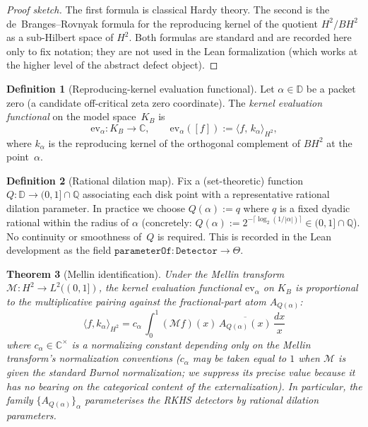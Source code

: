 \documentclass[12pt]{article}
\theoremstyle{plain}
\newtheorem{theorem}{Theorem}[section]
\theoremstyle{definition}
\newtheorem{definition}[theorem]{Definition}
\theoremstyle{remark}
\newcommand{\KB}{K_{B}}
\newcommand{\HardyTwo}{H^{2}}
\newcommand{\Disk}{\mathbb{D}}
\newcommand{\Complex}{\mathbb{C}}
\newcommand{\Rationals}{\mathbb{Q}}
\newcommand{\Mellin}{\mathcal{M}}
\begin{document}
\begin{proof}[Proof sketch]
The first formula is classical Hardy theory.  The second is the
de~Branges--Rovnyak formula for the reproducing kernel of the
quotient $\HardyTwo / B\HardyTwo$ as a sub-Hilbert space of
$\HardyTwo$.  Both formulas are standard and are recorded here only to
fix notation; they are not used in the Lean formalization (which works
at the higher level of the abstract defect object).
\end{proof}

\begin{definition}[Reproducing-kernel evaluation functional]
\label{def:evfunctional}
Let $\alpha\in\Disk$ be a packet zero (a candidate off-critical zeta
zero coordinate).  The \emph{kernel evaluation functional} on the
model space~$\KB$ is
\[
  \mathrm{ev}_\alpha\colon \KB\to\Complex,\qquad
  \mathrm{ev}_\alpha([f]) := \langle f,\, k_\alpha\rangle_{\HardyTwo},
\]
where $k_\alpha$ is the reproducing kernel of the orthogonal
complement of $B\HardyTwo$ at the point~$\alpha$.
\end{definition}

\begin{definition}[Rational dilation map]
\label{def:Q-of-alpha}
Fix a (set-theoretic) function $Q\colon\Disk\to (0,1]\cap\Rationals$
associating each disk point with a representative rational dilation
parameter.  In practice we choose $Q(\alpha) := q$ where $q$ is a
fixed dyadic rational within the radius of $\alpha$ (concretely:
$Q(\alpha) := 2^{-\lceil\log_{2}(1/|\alpha|)\rceil}\in
(0,1]\cap\Rationals$).  No continuity or smoothness of~$Q$ is
required.  This is recorded in the Lean development as the field
$\texttt{parameterOf}\colon \texttt{Detector}\to\Theta$.
\end{definition}

\begin{theorem}[Mellin identification]
\label{thm:mellin}
Under the Mellin transform $\Mellin\colon \HardyTwo\to L^{2}((0,1])$,
the kernel evaluation functional $\mathrm{ev}_\alpha$ on $\KB$ is
proportional to the multiplicative pairing against the fractional-part
atom $A_{Q(\alpha)}$:
\[
  \langle f, k_\alpha\rangle_{\HardyTwo}
  = c_\alpha\,
  \int_{0}^{1} (\Mellin f)(x)\,
    \overline{A_{Q(\alpha)}(x)}\,\frac{dx}{x}
\]
where $c_\alpha\in\Complex^{\times}$ is a normalizing constant
depending only on the Mellin transform's normalization conventions
($c_\alpha$ may be taken equal to $1$ when $\Mellin$ is given the
standard Burnol normalization; we suppress its precise value because
it has no bearing on the categorical content of the externalization).
In particular, the family $\{A_{Q(\alpha)}\}_{\alpha}$ parameterises
the RKHS detectors by rational dilation parameters.
\end{theorem}
\end{document}
